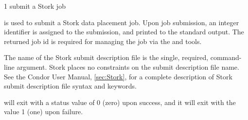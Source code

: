 \begin{ManPage}{\label{man-stork-submit}}{1}
{submit a Stork job}
\Synopsis {}
\ToolArgsBase

\Storkname
{}



\Description 

 is used to submit a Stork data placement job.
Upon job submission, an integer identifier is assigned to the
submission, and printed to the standard output.  The returned job id is
required for managing the job via the  and  tools.

The name of the Stork submit description file is the single,
required, command-line argument.  Stork places no constraints on the submit
description file name. See the Condor User Manual, \ref{sec:Stork}, for a
complete description of Stork submit description file syntax and keywords.

\begin{Options}
	\ToolArgsBaseDesc
	\StorknameDesc
\end{Options}

\ExitStatus

 will exit with a status value of 0 (zero) upon success,
and it will exit with the value 1 (one) upon failure.

\end{ManPage}
